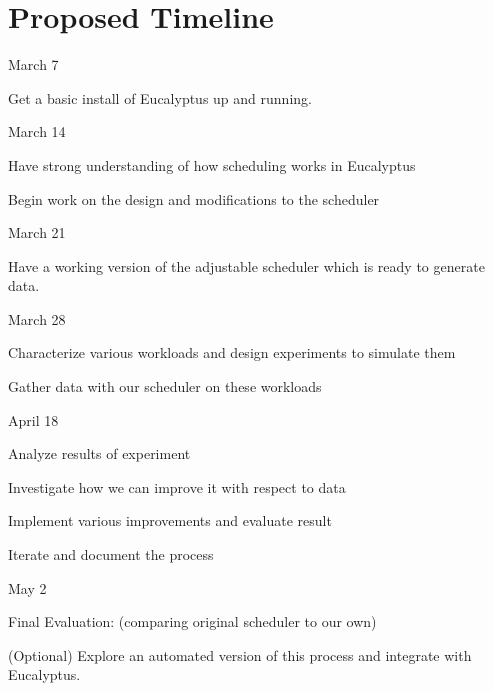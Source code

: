 \section{Proposed Timeline}
\begin{itemize*}
\item{March 7}
\begin{itemize*}
  \item Get a basic install of Eucalyptus up and running.
\end{itemize*}

\item{March 14}
\begin{itemize*}
  \item Have strong understanding of how scheduling works in Eucalyptus
  \item Begin work on the design and modifications to the scheduler
\end{itemize*}

\item{March 21}
\begin{itemize*}
  \item Have a working version of the adjustable scheduler which is ready to
    generate data.
\end{itemize*}

\item{March 28}
\begin{itemize*}
  \item Characterize various workloads and design experiments to simulate them
  \item Gather data with our scheduler on these workloads
\end{itemize*}

\item{April 18}
\begin{itemize*}
  \item Analyze results of experiment
  \item Investigate how we can improve it with respect to data
  \item Implement various improvements and evaluate result
  \item Iterate and document the process
\end{itemize*}

\item{May 2}
\begin{itemize*}
  \item Final Evaluation: (comparing original scheduler to our own)
  \item (Optional) Explore an automated version of this process and integrate
    with Eucalyptus.
\end{itemize*}
\end{itemize*}

